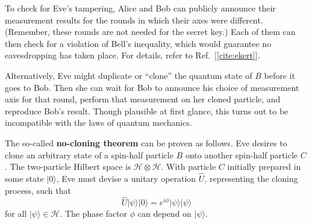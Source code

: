 \documentclass[prx,12pt]{revtex4-2}
\begin{document}
To check for Eve's tampering, Alice and Bob can publicly announce
their measurement results for the rounds in which their axes were
different.  (Remember, these rounds are not needed for the secret
key.)  Each of them can then check for a violation of Bell's
inequality, which would guarantee no eavesdropping has taken place.
For details, refer to Ref.~[\ref{cite:ekert}].

Alternatively, Eve might duplicate or ``clone'' the quantum state of
$B$ before it goes to Bob.  Then she can wait for Bob to announce his
choice of measurement axis for that round, perform that measurement on
her cloned particle, and reproduce Bob's result.  Though plausible at
first glance, this turns out to be incompatible with the laws of
quantum mechanics.

The so-called \textbf{no-cloning theorem} can be proven as follows.
Eve desires to clone an arbitrary state of a spin-half particle $B$
onto another spin-half particle $C$.  The two-particle Hilbert space
is $\mathscr{H}\otimes\mathscr{H}$.  With particle $C$ initially
prepared in some state $|0\rangle$, Eve must devise a unitary
operation $\hat{U}$, representing the cloning process, such that
\begin{equation}
  \hat{U} |\psi\rangle | 0\rangle = e^{i\phi} |\psi\rangle |\psi\rangle
  \label{clone}
\end{equation}
for all $|\psi\rangle \in \mathscr{H}$.  The phase factor $\phi$ can
depend on $|\psi\rangle$.
\end{document}
